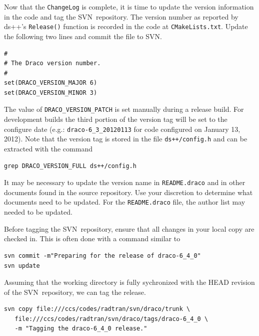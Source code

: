 \documentclass[note]{newmemo}
\newcommand{\svn}{\textsf{SVN}}
\begin{document}
Now that the \texttt{ChangeLog} is complete, it is time to update the
version information in the code and tag the \svn\ repository.  The
version number as reported by \textsf{ds++}'s \texttt{Release()}
function is recorded in the code at \texttt{CMakeLists.txt}.  Update
the following two lines and commit the file to \svn.
%
\begin{lstlisting}[basicstyle=\footnotesize, xleftmargin=2.0in, 
  xrightmargin=2.0in]
#
# The Draco version number.
#
set(DRACO_VERSION_MAJOR 6)
set(DRACO_VERSION_MINOR 3)
\end{lstlisting}
% 
The value of \texttt{DRACO\_VERSION\_PATCH} is set manually during a
release build.  For development builds the third portion of the
version tag will be set to the configure date (e.g.:
\texttt{draco-6\_3\_20120113} for code configured on January 13,
2012).  Note that the version tag is stored in the file
\texttt{ds++/config.h} and can be extracted with the command
\begin{lstlisting}[basicstyle=\footnotesize, xleftmargin=2.0in, 
  xrightmargin=2.0in]
grep DRACO_VERSION_FULL ds++/config.h 
\end{lstlisting}

It may be necessary to update the version name in
\texttt{README.draco} and in other documents found in the source
repository.  Use your discretion to determine what documents need to
be updated.  For the \texttt{README.draco} file, the author list may
needed to be updated.

Before tagging the \svn\ repository, ensure that all changes in your
local copy are checked in.  This is often done with a command similar
to
%
\begin{lstlisting}[basicstyle=\footnotesize, xleftmargin=1.0in, 
  xrightmargin=1.0in]
svn commit -m"Preparing for the release of draco-6_4_0"
svn update 
\end{lstlisting}
%
Assuming that the working directory is fully sychronized with the HEAD
revision of the \svn\ repository, we can tag the release.
%
\begin{lstlisting}[basicstyle=\footnotesize, xleftmargin=1.0in, 
  xrightmargin=1.0in]
svn copy file:///ccs/codes/radtran/svn/draco/trunk \
   file:///ccs/codes/radtran/svn/draco/tags/draco-6_4_0 \
   -m "Tagging the draco-6_4_0 release."
\end{lstlisting}

\end{document}
